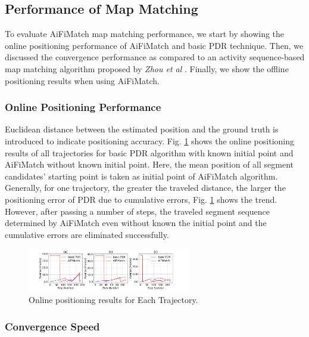 \documentclass[conference]{IEEEtran}
\begin{document}
\subsection{Performance of Map Matching}

To evaluate AiFiMatch map matching performance, we start by showing the online positioning performance of AiFiMatch and basic PDR technique. Then, we discussed the convergence performance as compared to an activity sequence-based map matching algorithm proposed by \emph{Zhou et al} \cite{zhou2015activity}. Finally, we show the offline positioning results when using AiFiMatch.

\subsubsection{Online Positioning Performance}

Euclidean distance between the estimated position and the ground truth is introduced to indicate positioning accuracy.  Fig. \ref{fig-online} shows the online positioning results of all trajectories for basic PDR algorithm with known initial point and AiFiMatch without known initial point.  Here, the mean position of all segment candidates' starting point is taken as initial point of AiFiMatch algorithm. Generally, for one trajectory, the greater the traveled distance, the larger the positioning error of PDR due to cumulative errors, Fig. \ref{fig-online} shows the trend.  However, after passing a number of steps, the traveled segment sequence determined by AiFiMatch even without known the initial point and the cumulative  errors are eliminated successfully.

\begin{figure}[!htbp]
	\centering
	\includegraphics[width=2.8in]{AiFiMatch-OnlinePosition}
	\caption{Online positioning results for Each Trajectory.}
	\label{fig-online}
\end{figure}

\subsubsection{Convergence Speed}
\end{document}
